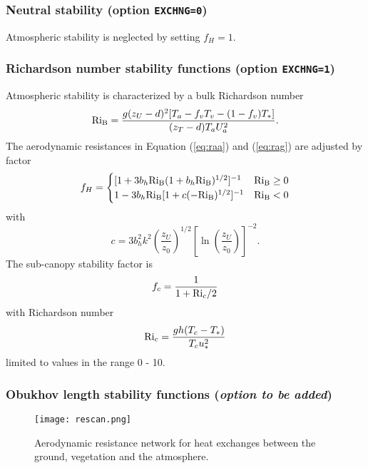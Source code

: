 \documentclass{article}
\begin{document}
\subsubsection{Neutral stability (option {\tt EXCHNG=0})}

Atmospheric stability is neglected by setting $f_H=1$.

\subsubsection{Richardson number stability functions (option {\tt EXCHNG=1})}

Atmospheric stability is characterized by a bulk Richardson number
\begin{equation}
{\rm Ri_B} = \frac{g(z_U-d)^2[T_a - f_vT_v - (1-f_v)T_*]}{(z_T-d) T_a U_a^2}.
\end{equation}
The aerodynamic resistances in Equation (\ref{eq:raa}) and (\ref{eq:rag}) are adjusted by factor
\begin{equation}
f_H  = \begin{cases} 
       [1 + 3b_h{\rm Ri_B}(1 + b_h{\rm Ri_B})^{1/2}]^{-1}  & {\rm Ri_B} \geq 0 \\
        1 - 3b_h{\rm Ri_B}[1 + c(-{\rm Ri_B})^{1/2}]^{-1}  & {\rm Ri_B} < 0
\end{cases}
\end{equation}
with 
\begin{equation}
c = 3b_h^2k^2\left(\frac{z_U}{z_0}\right)^{1/2}\left[\ln\left(\frac{z_U}{z_0}\right)\right]^{-2}.
\end{equation}
The sub-canopy stability factor is
\begin{equation}
f_c = \frac{1}{1 + {\rm Ri}_c/2}
\end{equation}
with Richardson number
\begin{equation}
{\rm Ri}_c = \frac{gh(T_c - T_*)}{T_c u_*^2}
\end{equation}
limited to values in the range 0 - 10.

\subsubsection{Obukhov length stability functions ({\it option to be added})}

\begin{figure}[t]
\texttt{[image: rescan.png]}
\caption{Aerodynamic resistance network for heat exchanges between the ground, vegetation and the atmosphere.}
\label{fig:rescan}
\end{figure}
\end{document}
